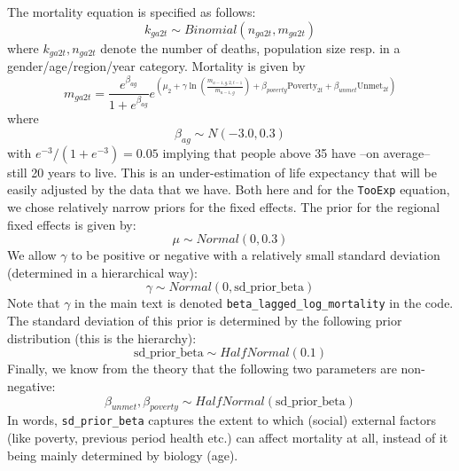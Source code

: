 \documentclass[a4paper,12pt]{article}
\begin{document}
The mortality equation is specified as follows:
\begin{equation}
\label{eq:binom}
k_{ga2t} \sim Binomial(n_{ga2t},m_{ga2t})
\end{equation}
where \(k_{ga2t},n_{ga2t}\) denote the number of deaths, population size resp. in a gender/age/region/year category. Mortality is given by
\begin{equation}
\label{eq:mortalitydist}
m_{ga2t} = \frac{e^{\beta_{ag}}}{1+e^{\beta_{ag}}} e^{\left( \mu_2 + \gamma \ln \left(\frac{m_{a-1,g,2,t-1}}{\bar{m}_{a-1,g}}\right)+ \beta_{poverty}\text{Poverty}_{2t} + \beta_{unmet}\text{Unmet}_{2t}\right)}
\end{equation}
where
\begin{equation}
\label{eq:7}
\beta_{ag} \sim N(-3.0,0.3)
\end{equation}
with \(e^{-3}/(1+e^{-3}) = 0.05\) implying that people above 35 have --on average-- still 20 years to live. This is an under-estimation of life expectancy that will be easily adjusted by the data that we have. Both here and for the \texttt{TooExp} equation, we chose relatively narrow priors for the fixed effects. The prior for the regional fixed effects is given by:
\begin{equation}
\label{eq:8}
\mu \sim Normal(0,0.3)
\end{equation}
We allow \(\gamma\) to be positive or negative with a relatively small standard deviation (determined in a hierarchical way):
\begin{equation}
\label{eq:9}
\gamma \sim Normal(0,\text{sd\_prior\_beta})
\end{equation}
Note that \(\gamma\) in the main text is denoted \texttt{beta\_lagged\_log\_mortality} in the code. The standard deviation of this prior is determined by the following prior distribution (this is the hierarchy):
\begin{equation}
\label{eq:10}
\text{sd\_prior\_beta} \sim HalfNormal(0.1)
\end{equation}
Finally, we know from the theory that the following two parameters are non-negative:
\begin{equation}
\label{eq:11}
\beta_{unmet}, \beta_{poverty} \sim HalfNormal(\text{sd\_prior\_beta})
\end{equation}
In words, \texttt{sd\_prior\_beta} captures the extent to which (social) external factors (like poverty, previous period health etc.) can affect mortality at all, instead of it being mainly determined by biology (age).
\end{document}
